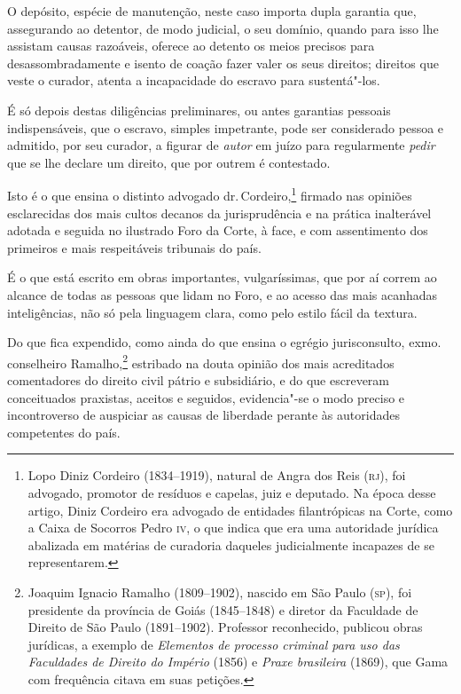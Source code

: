 O depósito, espécie de manutenção, neste caso importa dupla garantia
que, assegurando ao detentor, de modo judicial, o seu domínio, quando
para isso lhe assistam causas razoáveis, oferece ao detento os meios
precisos para desassombradamente e isento de coação fazer valer os seus
direitos; direitos que veste o curador, atenta a incapacidade do escravo
para sustentá"-los.

É só depois destas diligências preliminares, ou antes garantias pessoais
indispensáveis, que o escravo, simples impetrante, pode ser considerado
pessoa e admitido, por seu curador, a figurar de \emph{autor} em juízo
para regularmente \emph{pedir} que se lhe declare um direito, que por
outrem é contestado.

Isto é o que ensina o distinto advogado dr.\,Cordeiro,\footnote{Lopo
  Diniz Cordeiro (1834--1919), natural de Angra dos Reis (\textsc{rj}), foi
  advogado, promotor de resíduos e capelas, juiz e deputado. Na época
  desse artigo, Diniz Cordeiro era advogado de entidades filantrópicas
  na Corte, como a Caixa de Socorros Pedro \textsc{iv}, o que indica que era uma
  autoridade jurídica abalizada em matérias de curadoria daqueles
  judicialmente incapazes de se representarem.} firmado nas opiniões
esclarecidas dos mais cultos decanos da jurisprudência e na prática
inalterável adotada e seguida no ilustrado Foro da Corte, à face, e com
assentimento dos primeiros e mais respeitáveis tribunais do país.

É o que está escrito em obras importantes, vulgaríssimas, que por aí
correm ao alcance de todas as pessoas que lidam no Foro, e ao acesso das
mais acanhadas inteligências, não só pela linguagem clara, como pelo
estilo fácil da textura.

Do que fica expendido, como ainda do que ensina o egrégio jurisconsulto,
exmo.\,conselheiro Ramalho,\footnote{Joaquim Ignacio Ramalho
  (1809--1902), nascido em São Paulo (\textsc{sp}), foi presidente da província de
  Goiás (1845--1848) e diretor da Faculdade de Direito de São Paulo
  (1891--1902). Professor reconhecido, publicou obras jurídicas, a
  exemplo de \emph{Elementos de processo criminal para uso das
  Faculdades de Direito do Império} (1856) e \emph{Praxe brasileira}
  (1869), que Gama com frequência citava em suas petições.} estribado
na douta opinião dos mais acreditados comentadores do direito civil
pátrio e subsidiário, e do que escreveram conceituados praxistas,
aceitos e seguidos, evidencia"-se o modo preciso e incontroverso de
auspiciar as causas de liberdade perante às autoridades competentes do
país.

